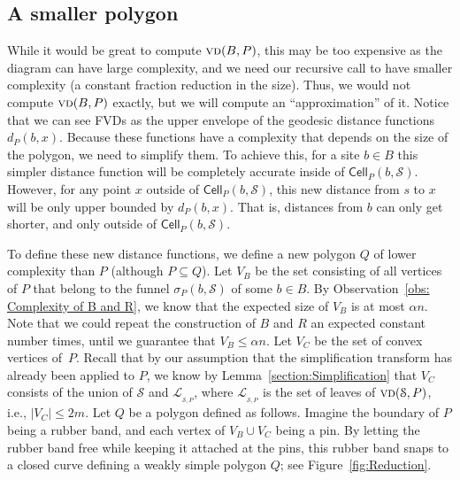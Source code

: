 \documentclass[a4paper,UKenglish]{socg-lipics-v2018}
\newcommand{\s}{\mathcal S}
\newcommand{\dd}[3][P]{\ensuremath{d_{#1}(#2, #3)}}
\newcommand{\funnel}[2][P]{\ensuremath{\sigma_{\scriptscriptstyle #1}(#2)}}
\newcommand{\cell}[2][P]{\ensuremath{\mathsf{Cell}_{\scriptscriptstyle #1}(#2)}}
\newcommand{\vd}[2][P]{\textsc{vd}(#2, #1)}
\newcommand{\LL}[1][\s, P]{\ensuremath{\mathcal L_{_{#1}}}}
\begin{document}
\subsection{A smaller polygon}\label{section:Smaller Polygon}
While it would be great to compute $\vd{B}$, this may be too expensive as the diagram can have large complexity, and we need our recursive call to have smaller complexity (a constant fraction reduction in the size). 
Thus, we would not compute $\vd{B}$ exactly, but we will compute an ``approximation'' of it. 
Notice that we can see FVDs as the upper envelope of the geodesic distance functions $\dd{b}{x}$. 
Because these functions have a complexity that depends on the size of the polygon, we need to simplify them.
To achieve this, for a site $b\in B$ this simpler distance function will be completely accurate inside of $\cell{b, \s}$. 
However, for any point $x$ outside of $\cell{b, \s}$, this new distance from $s$ to $x$ will be only upper bounded by $\dd{b}{x}$. 
That is, distances from $b$ can only get shorter, and only outside of $\cell{b, \s}$. 

To define these new distance functions, we define a new polygon $Q$ of lower complexity than $P$ (although $P\subseteq Q$).
Let $V_B$ be the set consisting of all vertices of $P$ that belong to the funnel $\funnel{b, \s}$ of some $b\in B$.
By Observation~\ref{obs: Complexity of B and R}, we know that the expected size of $V_B$ is at most $\alpha n$. 
Note that we could repeat the construction of $B$ and $R$ an expected constant number times, until we guarantee that $V_B\leq \alpha n$.
Let $V_C$ be the set of convex vertices of~$P$. Recall that by our assumption that the simplification transform has already been applied to $P$, 
we know by Lemma~\ref{section:Simplification} that $V_C$ consists of the union of $\s$ and $\LL$, where $\LL$ is the set of leaves of $\vd{\s}$, i.e., $|V_C| \leq 2m$.
Let $Q$ be a polygon defined as follows. 
Imagine the boundary of $P$ being a rubber band, and each vertex of $V_B\cup V_C$ being a pin.
By letting the rubber band free while keeping it attached at the pins, this rubber band snaps to a closed curve defining a weakly simple polygon $Q$; see Figure~\ref{fig:Reduction}.
\end{document}
